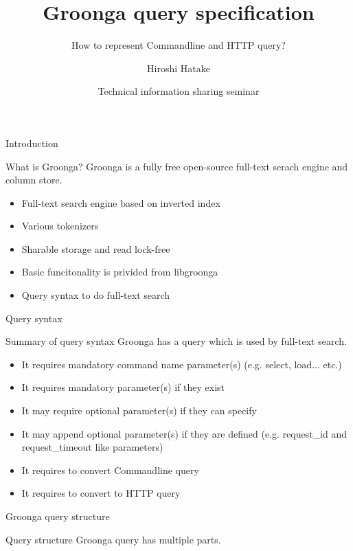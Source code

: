 \documentclass[12pt, unicode]{beamer}
\title{Groonga query specification}
\subtitle{How to represent Commandline and HTTP query?}
\author{Hiroshi Hatake}
\date[2016/03/12]{Technical information sharing seminar}
\begin{document}
\frame{\maketitle}

\begin{frame}{Introduction}
\begin{block}{What is Groonga?}
Groonga is a fully free open-source full-text serach engine and column store.
\end{block}
\begin{itemize}
\item<2-> Full-text search engine based on inverted index
\item<3-> Various tokenizers
\item<4-> Sharable storage and read lock-free
\item<5-> Basic funcitonality is privided from libgroonga
\item<6-> Query syntax to do full-text search
\end{itemize}
\end{frame}

\begin{frame}{Query syntax}
\begin{block}{Summary of query syntax}
Groonga has a query which is used by full-text search.
\end{block}
\begin{itemize}
\item<2-> It requires mandatory command name parameter(s) (e.g. select, load... etc.)
\item<3-> It requires mandatory parameter(s) if they exist
\item<4-> It may require optional parameter(s) if they can specify
\item<5-> It may append optional parameter(s) if they are defined (e.g. request\_id and request\_timeout like parameters)
\item<6-> It requires to convert Commandline query
\item<7-> It requires to convert to HTTP query
\end{itemize}
\end{frame}

\begin{frame}{Groonga query structure}
\begin{block}{Query structure}
Groonga query has multiple parts.
\end{block}
\begin{table}[htb]
\end{table}
\end{frame}
\end{document}
